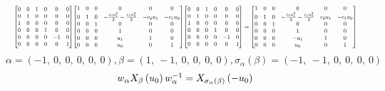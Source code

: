 \documentclass[11pt]{article}
\theoremstyle{definition}
\begin{document}
\[
\scaletoalign{\textwidth}{{\left[\begin{matrix}0 & 0 & 1 & 0 & 0 & 0\\0 & 1 & 0 & 0 & 0 & 0\\1 & 0 & 0 & 0 & 0 & 0\\0 & 0 & 0 & 1 & 0 & 0\\0 & 0 & 0 & 0 & -1 & 0\\0 & 0 & 0 & 0 & 0 & 1\end{matrix}\right]} {\left[\begin{matrix}1 & 0 & 0 & 0 & 0 & 0\\0 & 1 & 0 & - \frac{c_{0} u_{1}^{2}}{2} - \frac{c_{1} u_{0}^{2}}{2} & - c_{0} u_{1} & - c_{1} u_{0}\\0 & 0 & 1 & 0 & 0 & 0\\0 & 0 & 0 & 1 & 0 & 0\\0 & 0 & 0 & u_{1} & 1 & 0\\0 & 0 & 0 & u_{0} & 0 & 1\end{matrix}\right]} {\left[\begin{matrix}0 & 0 & 1 & 0 & 0 & 0\\0 & 1 & 0 & 0 & 0 & 0\\1 & 0 & 0 & 0 & 0 & 0\\0 & 0 & 0 & 1 & 0 & 0\\0 & 0 & 0 & 0 & -1 & 0\\0 & 0 & 0 & 0 & 0 & 1\end{matrix}\right]} = {\left[\begin{matrix}1 & 0 & 0 & 0 & 0 & 0\\0 & 1 & 0 & - \frac{c_{0} u_{1}^{2}}{2} - \frac{c_{1} u_{0}^{2}}{2} & c_{0} u_{1} & - c_{1} u_{0}\\0 & 0 & 1 & 0 & 0 & 0\\0 & 0 & 0 & 1 & 0 & 0\\0 & 0 & 0 & - u_{1} & 1 & 0\\0 & 0 & 0 & u_{0} & 0 & 1\end{matrix}\right]}}
\]
\[
\alpha = \left( -1, \  0, \  0, \  0, \  0, \  0\right), \beta = \left( 1, \  -1, \  0, \  0, \  0, \  0\right), \sigma_{\alpha}(\beta) = \left( -1, \  -1, \  0, \  0, \  0, \  0\right)
\]
\[
\scaletoalign{\textwidth}{w_{\alpha} X_{\beta}\left(u_{0}\right) w_{\alpha}^{-1} = X_{\sigma_{\alpha}\left(\beta\right)}\left(- u_{0}\right)}
\]
\end{document}
